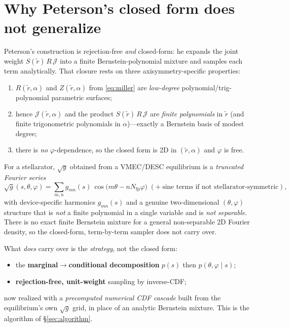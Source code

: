 \documentclass[11pt]{article}
\newcommand{\sg}{\sqrt{g}}
\newcommand{\Nfp}{N_{\mathrm{fp}}}
\begin{document}
\section{Why Peterson's closed form does not generalize}
\label{sec:bernstein}

Peterson's construction is rejection-free \emph{and} closed-form: he expands the
joint weight $S(\tilde r)\,R\,\mathcal{J}$ into a finite Bernstein-polynomial
mixture and samples each term analytically. That closure rests on three
axisymmetry-specific properties:
\begin{enumerate}
\item $R(\tilde r,\alpha)$ and $Z(\tilde r,\alpha)$ from \eqref{eq:miller} are
\emph{low-degree} polynomial/trig-polynomial parametric surfaces;
\item hence $\mathcal{J}(\tilde r,\alpha)$ and the product
$S(\tilde r)\,R\,\mathcal{J}$ are \emph{finite polynomials} in $\tilde r$ (and finite
trigonometric polynomials in $\alpha$)---exactly a Bernstein basis of modest degree;
\item there is \emph{no} $\varphi$-dependence, so the closed form is 2D in $(\tilde
r,\alpha)$ and $\varphi$ is free.
\end{enumerate}

For a stellarator, $\sg$ obtained from a VMEC/DESC equilibrium is a
\emph{truncated Fourier series}
\begin{equation}
\sg(s,\theta,\varphi)=\sum_{m,n} g_{mn}(s)\,
\cos\!\big(m\theta-n\Nfp\varphi\big)\;(+\ \text{sine terms if not
stellarator-symmetric}),
\label{eq:fouriersg}
\end{equation}
with device-specific harmonics $g_{mn}(s)$ and a genuine two-dimensional
$(\theta,\varphi)$ structure that is \emph{not} a finite polynomial in a single
variable and is \emph{not separable}. There is no exact finite Bernstein mixture for
a general non-separable 2D Fourier density, so the closed-form, term-by-term sampler
does not carry over.

What \emph{does} carry over is the \emph{strategy}, not the closed form:
\begin{itemize}
\item the \textbf{marginal$\to$conditional decomposition} $p(s)$ then
$p(\theta,\varphi\mid s)$;
\item \textbf{rejection-free, unit-weight} sampling by inverse-CDF;
\end{itemize}
now realized with a \emph{precomputed numerical CDF cascade} built from the
equilibrium's own $\sg$ grid, in place of an analytic Bernstein mixture. This is the
algorithm of \S\ref{sec:algorithm}.
\end{document}

